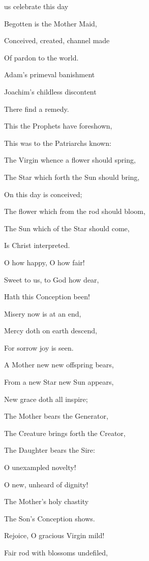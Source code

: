 \begin{multicols}{2}
 us celebrate this day\par
{}
Begotten is the Mother Maid,

Conceived, created, channel made

Of pardon to the world.

Adam's primeval banishment

Joachim's childless discontent

There find a remedy.\\
\par
This the Prophets have foreshown,

This was to the Patriarchs known:

The Virgin whence a flower should spring,

The Star which forth the Sun should bring,

On this day is conceived;

The flower which from the rod should bloom,

The Sun which of the Star should come,

Is Christ interpreted.\\
\par
O how happy, O how fair!

Sweet to us, to God how dear,

Hath this Conception been!

Misery now is at an end,

Mercy doth on earth descend,

For sorrow joy is seen.

A Mother new new offspring bears,

From a new Star new Sun appears,

New grace doth all inspire;

The Mother bears the Generator,

The Creature brings forth the Creator,

The Daughter bears the Sire:\\
\par
O unexampled novelty!

O new, unheard of dignity!

The Mother's holy chastity

The Son's Conception shows.

Rejoice, O gracious Virgin mild!

Fair rod with blossoms undefiled,


\end{multicols}

